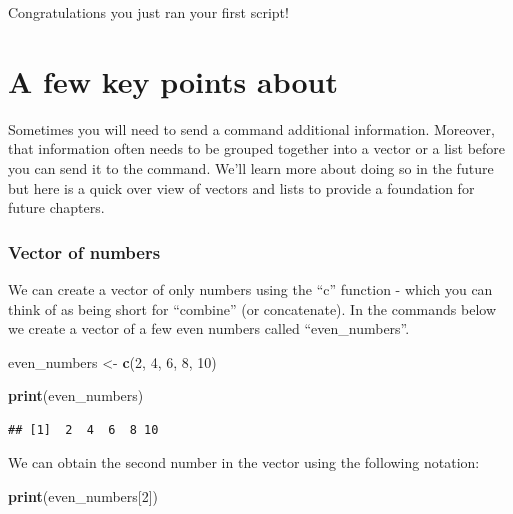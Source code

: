 \documentclass[
]{krantz}
\makeatletter
\newenvironment{Shaded}{\begin{snugshade}}{\end{snugshade}}
\newcommand{\DecValTok}[1]{\textcolor[rgb]{0.06,0.06,0.06}{#1}}
\newcommand{\KeywordTok}[1]{\textcolor[rgb]{0.27,0.27,0.27}{\textbf{#1}}}
\newcommand{\NormalTok}[1]{#1}
\newcommand{\StringTok}[1]{\textcolor[rgb]{0.5,0.5,0.5}{#1}}
\newenvironment{kframe}{%
\medskip{}
\setlength{\fboxsep}{.8em}
 \def\at@end@of@kframe{}%
 \ifinner\ifhmode%
  \def\at@end@of@kframe{\end{minipage}}%
  \begin{minipage}{\columnwidth}%
 \fi\fi%
 \def\FrameCommand##1{\hskip\@totalleftmargin \hskip-\fboxsep
 \colorbox{shadecolor}{##1}\hskip-\fboxsep
     \hskip-\linewidth \hskip-\@totalleftmargin \hskip\columnwidth}%
 \MakeFramed {\advance\hsize-\width
   \@totalleftmargin\z@ \linewidth\hsize
   \@setminipage}}%
 {\par\unskip\endMakeFramed%
 \at@end@of@kframe}
\renewenvironment{Shaded}{\begin{kframe}}{\end{kframe}}
\makeatother
\begin{document}
Congratulations you just ran your first script!

\hypertarget{a-few-key-points-about}{%
\section{A few key points about}\label{a-few-key-points-about}}

Sometimes you will need to send a command additional information. Moreover, that information often needs to be grouped together into a vector or a list before you can send it to the command. We'll learn more about doing so in the future but here is a quick over view of vectors and lists to provide a foundation for future chapters.

\hypertarget{vector-of-numbers}{%
\subsubsection{Vector of numbers}\label{vector-of-numbers}}

We can create a vector of only numbers using the ``c'' function - which you can think of as being short for ``combine'' (or concatenate). In the commands below we create a vector of a few even numbers called ``even\_numbers''.

\begin{Shaded}
\begin{Highlighting}[]
\NormalTok{even_numbers <-}\StringTok{ }\KeywordTok{c}\NormalTok{(}\DecValTok{2}\NormalTok{, }\DecValTok{4}\NormalTok{, }\DecValTok{6}\NormalTok{, }\DecValTok{8}\NormalTok{, }\DecValTok{10}\NormalTok{)}
\end{Highlighting}
\end{Shaded}

\begin{Shaded}
\begin{Highlighting}[]
\KeywordTok{print}\NormalTok{(even_numbers)}
\end{Highlighting}
\end{Shaded}

\begin{verbatim}
## [1]  2  4  6  8 10
\end{verbatim}

We can obtain the second number in the vector using the following notation:

\begin{Shaded}
\begin{Highlighting}[]
\KeywordTok{print}\NormalTok{(even_numbers[}\DecValTok{2}\NormalTok{])}
\end{Highlighting}
\end{Shaded}
\end{document}
